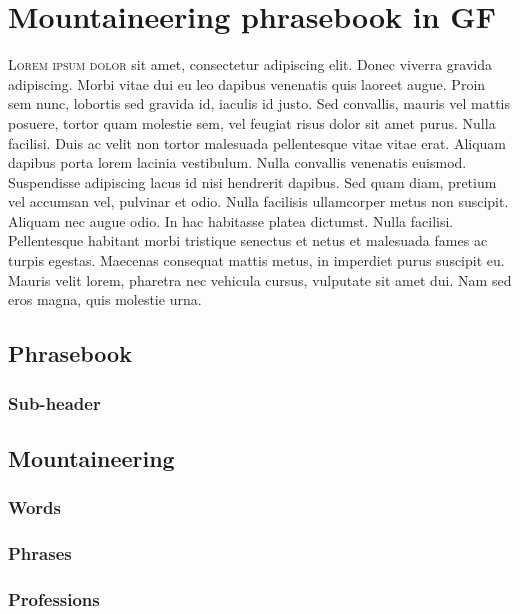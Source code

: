 \chapter{Mountaineering phrasebook in GF}
\lettrine[lines=4, loversize=-0.1, lraise=0.1]{L}{orem ipsum dolor} sit amet, consectetur adipiscing elit. Donec viverra gravida adipiscing. Morbi vitae dui eu leo dapibus venenatis quis laoreet augue. Proin sem nunc, lobortis sed gravida id, iaculis id justo. Sed convallis, mauris vel mattis posuere, tortor quam molestie sem, vel feugiat risus dolor sit amet purus. Nulla facilisi. Duis ac velit non tortor malesuada pellentesque vitae vitae erat. Aliquam dapibus porta lorem lacinia vestibulum. Nulla convallis venenatis euismod. Suspendisse adipiscing lacus id nisi hendrerit dapibus. Sed quam diam, pretium vel accumsan vel, pulvinar et odio. Nulla facilisis ullamcorper metus non suscipit. Aliquam nec augue odio. In hac habitasse platea dictumst. Nulla facilisi. Pellentesque habitant morbi tristique senectus et netus et malesuada fames ac turpis egestas. Maecenas consequat mattis metus, in imperdiet purus suscipit eu. Mauris velit lorem, pharetra nec vehicula cursus, vulputate sit amet dui. Nam sed eros magna, quis molestie urna.

\section{Phrasebook}
\subsection{Sub-header}

\section{Mountaineering}
\subsection{Words}
\subsection{Phrases}
\subsection{Professions}
